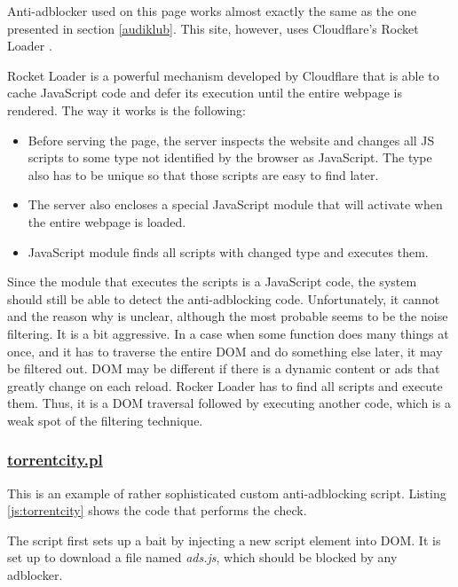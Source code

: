 Anti-adblocker used on this page works almost exactly the same as the one presented in section \ref{audiklub}.
This site, however, uses Cloudflare's Rocket Loader \cite{cloud-flare:rocket-loader}.

Rocket Loader is a powerful mechanism developed by Cloudflare that is able to cache JavaScript code and defer its execution 
until the entire webpage is rendered. The way it works is the following: 
\begin{itemize}
  \item  Before serving the page, the server inspects the website and changes all JS scripts 
            to some type not identified by the browser as JavaScript. 
            The type also has  to be unique so that those scripts are easy to find later.
  \item The server also encloses a special JavaScript module that will activate when the entire webpage is loaded.
  \item JavaScript module finds all scripts with changed type and executes them.
\end{itemize}

Since the module that executes the scripts is a JavaScript code, the system should still be able
to detect the anti-adblocking code. Unfortunately, it cannot and the reason why is unclear, although 
the most probable seems to be the noise filtering. It is a bit aggressive. In a case when some function
does many things at once, and it has to traverse the entire DOM and do something else later, 
it may be filtered out. DOM may be different if there is a dynamic content 
or ads that greatly change on each reload.
Rocker Loader has to find all scripts and execute them. Thus, it is a DOM traversal followed by executing
another code, which is a weak spot of the filtering technique.

\subsubsection{\url{torrentcity.pl}}
This is an example of rather sophisticated custom anti-adblocking script.
Listing \ref{js:torrentcity} shows the code that performs the check.


                       
The script first sets up a bait by injecting a new script element into DOM. It is set up to download
a file named \emph{ads.js}, which should be blocked by any adblocker.

